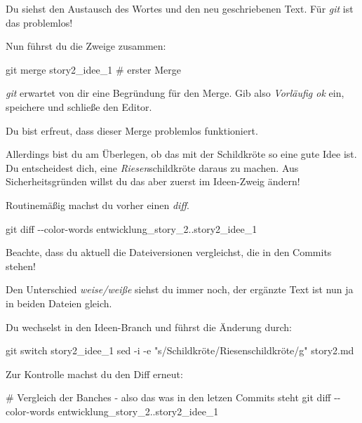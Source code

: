 \documentclass[
  letterpaper,
  DIV=11]{scrreprt}
\newenvironment{Shaded}{\begin{snugshade}}{\end{snugshade}}
\newcommand{\AttributeTok}[1]{\textcolor[rgb]{0.40,0.45,0.13}{#1}}
\newcommand{\CommentTok}[1]{\textcolor[rgb]{0.37,0.37,0.37}{#1}}
\newcommand{\FunctionTok}[1]{\textcolor[rgb]{0.28,0.35,0.67}{#1}}
\newcommand{\NormalTok}[1]{\textcolor[rgb]{0.00,0.23,0.31}{#1}}
\newcommand{\StringTok}[1]{\textcolor[rgb]{0.13,0.47,0.30}{#1}}
\newcommand{\git}{\textit{git}\xspace}
\begin{document}
Du siehst den Austausch des Wortes und den neu geschriebenen Text. Für
\git ist das problemlos!

Nun führst du die Zweige zusammen:

\begin{Shaded}
\begin{Highlighting}[]
\FunctionTok{git}\NormalTok{ merge story2\_idee\_1  }\CommentTok{\# erster Merge}
\end{Highlighting}
\end{Shaded}

\git erwartet von dir eine Begründung für den Merge. Gib also
\emph{Vorläufig ok} ein, speichere und schließe den Editor.

Du bist erfreut, dass dieser Merge problemlos funktioniert.

Allerdings bist du am Überlegen, ob das mit der Schildkröte so eine gute
Idee ist. Du entscheidest dich, eine \emph{Riesen}schildkröte daraus zu
machen. Aus Sicherheitsgründen willst du das aber zuerst im Ideen-Zweig
ändern!

Routinemäßig machst du vorher einen \emph{diff}.

\begin{Shaded}
\begin{Highlighting}[]
\FunctionTok{git}\NormalTok{ diff }\AttributeTok{{-}{-}color{-}words}\NormalTok{ entwicklung\_story\_2..story2\_idee\_1}
\end{Highlighting}
\end{Shaded}

Beachte, dass du aktuell die Dateiversionen vergleichst, die in den
Commits stehen!

Den Unterschied \emph{weise/weiße} siehst du immer noch, der ergänzte
Text ist nun ja in beiden Dateien gleich.

Du wechselst in den Ideen-Branch und führst die Änderung durch:

\begin{Shaded}
\begin{Highlighting}[]
\FunctionTok{git}\NormalTok{ switch story2\_idee\_1 }
\FunctionTok{sed} \AttributeTok{{-}i} \AttributeTok{{-}e} \StringTok{"s/Schildkröte/Riesenschildkröte/g"}\NormalTok{ story2.md}
\end{Highlighting}
\end{Shaded}

Zur Kontrolle machst du den Diff erneut:

\begin{Shaded}
\begin{Highlighting}[]
\CommentTok{\# Vergleich der Banches {-} also das was in den letzen Commits steht}
\FunctionTok{git}\NormalTok{ diff }\AttributeTok{{-}{-}color{-}words}\NormalTok{ entwicklung\_story\_2..story2\_idee\_1}
\end{Highlighting}
\end{Shaded}
\end{document}
